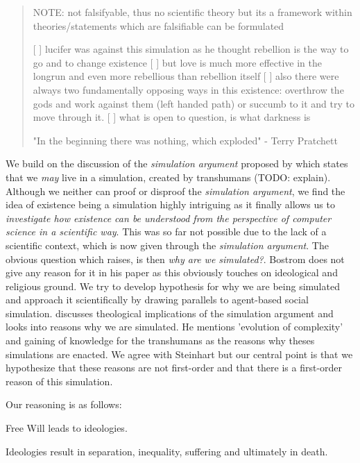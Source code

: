 \documentclass[twocolumn]{article}
\begin{document}
\begin{abstract}
NOTE: not falsifyable, thus no scientific theory but its a framework within theories/statements which are falsifiable can be formulated

[ ] lucifer was against this simulation as he thought rebellion is the way to go and to change existence
[ ] but love is much more effective in the longrun and even more rebellious than rebellion itself
[ ] also there were always two fundamentally opposing ways in this existence: overthrow the gods and work against them (left handed path) or succumb to it and try to move through it.
[ ] what is open to question, is what darkness is

\bigskip

"In the beginning there was nothing, which exploded" - Terry Pratchett

\end{abstract}


We build on the discussion of the \textit{simulation argument} proposed by \cite{bostrom_are_2003} which states that we \textit{may} live in a simulation, created by transhumans (TODO: explain). Although we neither can proof or disproof the \textit{simulation argument}, we find the idea of existence being a simulation highly intriguing as it finally allows us to \textit{investigate how existence can be understood from the perspective of computer science in a scientific way}. This was so far not possible due to the lack of a scientific context, which is now given through the \textit{simulation argument}. The obvious question which raises, is then \textit{why are we simulated?}. Bostrom does not give any reason for it in his paper as this obviously touches on ideological and religious ground. We try to develop hypothesis for why we are being simulated and approach it scientifically by drawing parallels to agent-based social simulation.
\cite{steinhart_theological_2010} discusses theological implications of the simulation argument and looks into reasons why we are simulated. He mentions 'evolution of complexity' and gaining of knowledge for the transhumans as the reasons why theses simulations are enacted. We agree with Steinhart but our central point is that we hypothesize that these reasons are not first-order and that there is a first-order reason of this simulation.

Our reasoning is as follows:

\begin{theorem}
Free Will leads to ideologies.
\end{theorem}

\begin{theorem}
Ideologies result in separation, inequality, suffering and ultimately in death.
\end{theorem}
\end{document}

